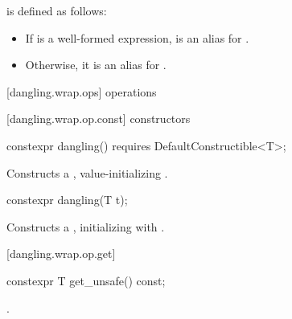 \begin{addedblock}
\pnum
{} is defined as follows:
\begin{itemize}
\item
  If  is a well-formed expression,
   is an alias for .
\item
  Otherwise, it is an alias for .
\end{itemize}
\end{addedblock}

[dangling.wrap.ops]{ operations}

[dangling.wrap.op.const]{ constructors}

%
\begin{itemdecl}
constexpr dangling() requires DefaultConstructible<T>;
\end{itemdecl}

\begin{itemdescr}
\pnum
\effects Constructs a , value-initializing .
\end{itemdescr}

%
\begin{itemdecl}
constexpr dangling(T t);
\end{itemdecl}

\begin{itemdescr}
\pnum
\effects Constructs a , initializing  with
.
\end{itemdescr}

[dangling.wrap.op.get]{}

%
%
\begin{itemdecl}
constexpr T get_unsafe() const;
\end{itemdecl}

\begin{itemdescr}
\pnum
\returns {}.
\end{itemdescr}

\setcounter{SectionDepthBase}{0}
